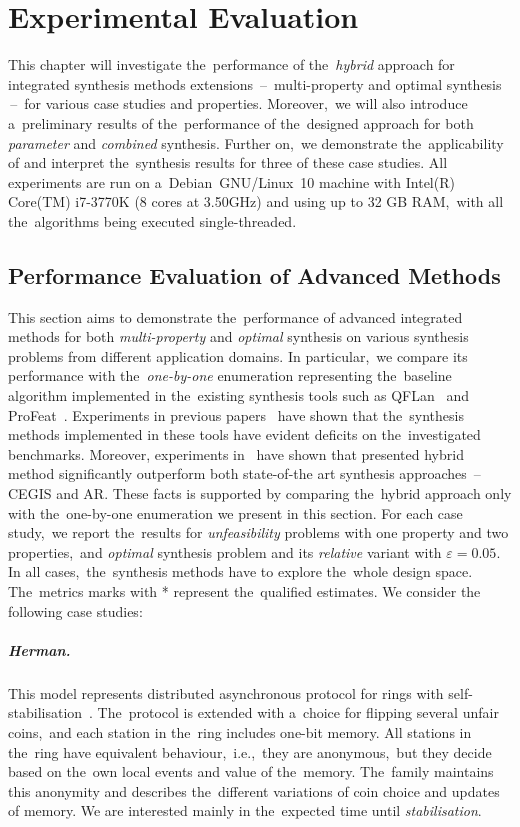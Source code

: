 \chapter{Experimental Evaluation}\label{chap:experiments}
This chapter will investigate the~performance of the~\emph{hybrid} approach for integrated synthesis methods extensions \,--\, multi-property and optimal synthesis \,--\, for various case studies and properties.
Moreover,~we will also introduce a~preliminary results of the~performance of the~designed approach for both \emph{parameter} and \emph{combined} synthesis.
Further on,~we demonstrate the~applicability of \toolname{} and interpret the~synthesis results for three of these case studies.
All experiments are run on a~Debian~GNU/Linux~10 machine with Intel(R) Core(TM) i7-3770K (8 cores at 3.50GHz) and using up to 32 GB RAM,~with all the~algorithms being executed single-threaded.

\section{Performance Evaluation of Advanced Methods}
This section aims to demonstrate the~performance of advanced integrated methods for both \textit{multi-property} and \textit{optimal} synthesis on various synthesis problems from different application domains.
In particular,~we compare its performance with the~\emph{one-by-one} enumeration representing the~baseline algorithm implemented in the~existing synthesis tools such as QFLan~\cite{qflan} and ProFeat~\cite{profeat}.
Experiments in previous papers~\cite{cegar,cegis} have shown that the~synthesis methods implemented in these tools have evident deficits on the~investigated benchmarks.
Moreover, experiments in~\cite{roman-DP} have shown that presented hybrid method significantly outperform both state-of-the art synthesis approaches \,--\, CEGIS and AR.
These facts is supported by comparing the~hybrid approach only with the~one-by-one enumeration we present in this section.
For each case study,~we report the~results for \textit{unfeasibility} problems with one property and two properties,~and \textit{optimal} synthesis problem and its \textit{relative} variant with $\varepsilon = 0.05$.
In all cases,~the~synthesis methods have to explore the~whole design space.
The~metrics marks with * represent the~qualified estimates.
We consider the following case studies:

\paragraph{Herman.}
This model represents distributed asynchronous protocol for rings with self-stabilisation~\cite{herman1,herman2}.
The~protocol is extended with a~choice for flipping several unfair coins,~and each station in the~ring includes one-bit memory.
All stations in the~ring have equivalent behaviour,~i.e.,~they are anonymous,~but they decide based on the~own local events and value of the~memory.
The~family maintains this anonymity and describes the~different variations of coin choice and updates of memory.
We are interested mainly in the~expected time until \emph{stabilisation}.
    
